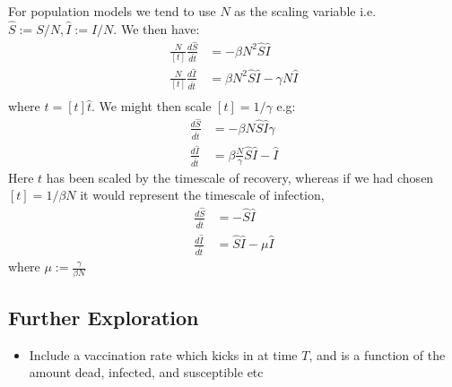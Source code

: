 \documentclass[a4paper,openany,nobib]{tufte-book}
\begin{document}
For population models we tend to use $N$ as the scaling variable i.e. $\hat S := S/N, \hat I := I/N$.
We then have:
\begin{align*}
	\frac{N}{[t]} \frac{d\hat S}{d\hat t} &= -\beta N^2 \hat S \hat I\\
	\frac{N}{[t]} \frac{d\hat I}{d\hat t} &= \beta N^2 \hat S \hat I - \gamma N \hat I\\
\end{align*}
where $t = [t]\hat t$.
We might then scale $[t] = 1/\gamma$ e.g:
\begin{align*}
	\frac{d\hat S}{d\hat t} &= -\beta N \hat S \hat I \gamma\\
	 \frac{d\hat I}{d\hat t} &= \beta \frac{N}{\gamma}  \hat S \hat I -  \hat I
\end{align*}
Here $t$ has been scaled by the timescale of recovery, whereas if we had chosen $[t] = 1/\beta N$ it would represent the timescale of infection,
\begin{align}
	\label{eq:nd1}
	\frac{d\hat S}{d\hat t} &= -\hat S \hat I\\
	\label{eq:nd2}
	 \frac{d\hat I}{d\hat t} &= \hat S \hat I - \mu \hat I
\end{align}
where $\mu := \frac{\gamma}{\beta N}$ 

\subsection{Further Exploration}%
\label{sub:Further Exploration}

\begin{itemize}
	\item Include a vaccination rate which kicks in at time $T$, and is a function of the amount dead, infected, and susceptible etc
\end{itemize}
\end{document}
